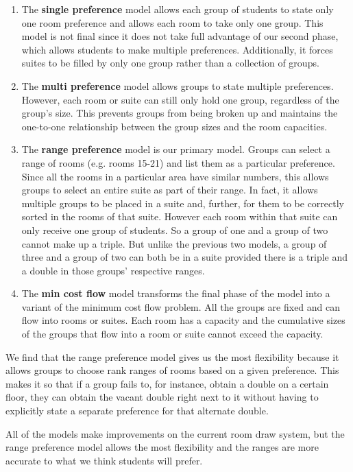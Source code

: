 \documentclass[12pt]{article}
\begin{document}
    \begin{enumerate}
        \item The \textbf{single preference} model allows each group of students to state only one room preference and allows each room to take only one group. This model is not final since it does not take full advantage of our second phase, which allows students to make multiple preferences. Additionally, it forces suites to be filled by only one group rather than a collection of groups. 
        \item The \textbf{multi preference} model allows groups to state multiple preferences. However, each room or suite can still only hold one group, regardless of the group's size. This prevents groups from being broken up and maintains the one-to-one relationship between the group sizes and the room capacities. 
        \item The \textbf{range preference} model is our primary model. Groups can select a range of rooms (e.g. rooms 15-21) and list them as a particular preference. Since all the rooms in a particular area have similar numbers, this allows groups to select an entire suite as part of their range. In fact, it allows multiple groups to be placed in a suite and, further, for them to be correctly sorted in the rooms of that suite. However each room within that suite can only receive one group of students. So a group of one and a group of two cannot make up a triple. But unlike the previous two models, a group of three and a group of two can both be in a suite provided there is a triple and a double in those groups' respective ranges.
        \item The \textbf{min cost flow} model transforms the final phase of the model into a variant of the minimum cost flow problem. All the groups are fixed and can flow into rooms or suites. Each room has a capacity and the cumulative sizes of the groups that flow into a room or suite cannot exceed the capacity. 
    \end{enumerate}
    
   We find that the range preference model gives us the most flexibility because it allows groups to choose rank ranges of rooms based on a given preference. This makes it so that if a group fails to, for instance, obtain a double on a certain floor, they can obtain the vacant double right next to it without having to explicitly state a separate preference for that alternate double. 
   
   All of the models make improvements on the current room draw system, but the range preference model allows the most flexibility and the ranges are more accurate to what we think students will prefer. 
   
\end{document}
